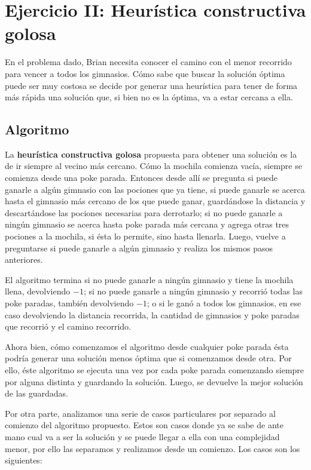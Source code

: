 \section{Ejercicio II: Heurística constructiva golosa}

En el problema dado, Brian necesita conocer el camino con el menor recorrido para vencer a todos los gimnasios. Cómo sabe que buscar la solución óptima puede ser muy costosa se decide por generar una heurística para tener de forma más rápida una solución que, si bien no es la óptima, va a estar cercana a ella.

\subsection{Algoritmo}

La \textbf{heurística constructiva golosa} propuesta para obtener una solución es la de ir siempre al vecino más cercano. Cómo la mochila comienza vacía, siempre se comienza desde una poke parada. Entonces desde allí se pregunta si puede ganarle a algún gimnasio con las pociones que ya tiene, si puede ganarle se acerca hasta el gimnasio más cercano de los que puede ganar, guardándose la distancia y descartándose las pociones necesarias para derrotarlo; si no puede ganarle a ningún gimnasio se acerca hasta poke parada más cercana y agrega otras tres pociones a la mochila, si ésta lo permite, sino hasta llenarla. Luego, vuelve a preguntarse si puede ganarle a algún gimnasio y realiza los mismos pasos anteriores.

El algoritmo termina si no puede ganarle a ningún gimnasio y tiene la mochila llena, devolviendo $-1$; si no puede ganarle a ningún gimnasio y recorrió todas las poke paradas, también devolviendo $-1$; o si le ganó a todos los gimnasios, en ese caso devolviendo la distancia recorrida, la cantidad de gimnasios y poke paradas que recorrió y el camino recorrido.

Ahora bien, cómo comenzamos el algoritmo desde cualquier poke parada ésta podría generar una solución menos óptima que si comenzamos desde otra. Por ello, éste algoritmo se ejecuta una vez por cada poke parada comenzando siempre por alguna distinta y guardando la solución. Luego, se devuelve la mejor solución de las guardadas.

Por otra parte, analizamos una serie de casos particulares por separado al comienzo del algoritmo propuesto. Estos son casos donde ya se sabe de ante mano cual va a ser la solución y se puede llegar a ella con una complejidad menor, por ello las separamos y realizamos desde un comienzo. Los casos son los siguientes:

